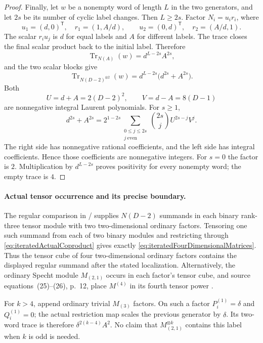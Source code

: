 \begin{proof}
Finally, let \(w\) be a nonempty word of length \(L\) in
the two generators, and let \(2s\) be its number of cyclic
label changes. Then \(L\ge2s\). Factor
\(N_i=u_i r_i\), where
\[
 u_1=(d,0)^{\mathsf T},\quad r_1=(1,A/d),\qquad
 u_2=(0,d)^{\mathsf T},\quad r_2=(A/d,1).
\]
The scalar \(r_i u_j\) is \(d\) for equal labels and
\(A\) for different labels. The trace closes the final
scalar product back to the initial label. Therefore
\[
 \operatorname{Tr}_{N(A)}(w)=d^{L-2s}A^{2s},
\]
and the two scalar blocks give
\begin{equation}\label{eq:iteratedAllWordTrace}
 \operatorname{Tr}_{N(D-2)^{\otimes2}}(w)
          =d^{L-2s}\bigl(d^{2s}+A^{2s}\bigr).
\end{equation}
Both
\[
 U=d+A=2(D-2)^2,\qquad V=d-A=8(D-1)
\]
are nonnegative integral Laurent polynomials. For \(s\ge1\),
\[
 d^{2s}+A^{2s}
   =2^{1-2s}
      \sum_{\substack{0\le j\le2s\\ j\ \mathrm{even}}}
        \binom{2s}{j}U^{2s-j}V^j.
\]
The right side has nonnegative rational coefficients,
and the left side has integral coefficients. Hence those
coefficients are nonnegative integers. For \(s=0\) the
factor is \(2\). Multiplication by \(d^{L-2s}\) proves
positivity for every nonempty word; the empty trace is \(4\).
\end{proof}

\paragraph{Actual tensor occurrence and its precise boundary.}
The regular comparison in / supplies
\(N(D-2)\) summands in each binary rank-three tensor module
with two two-dimensional ordinary factors.
Tensoring one such summand from each of two binary
modules and restricting through
\eqref{eq:iteratedActualCoproduct} gives exactly
\eqref{eq:iteratedFourDimensionalMatrices}.
Thus the tensor cube of four two-dimensional ordinary
factors contains the displayed regular summand after
the stated localization.
Alternatively, the ordinary Specht module \(M_{(2,1)}\)
occurs in each factor's tensor cube, and source
equations~(25)--(26), p.~12, place \(M^{(4)}\) in its
fourth tensor power \cite{BlasiakChebyshev}.

For \(k>4\), append ordinary trivial \(M_{(3)}\) factors.
On such a factor \(P_i^{(1)}=\delta\) and \(Q_i^{(1)}=0\);
the actual restriction map scales the previous generator
by \(\delta\). Its two-word trace is therefore
\(\delta^{2(k-4)}A^2\).
No claim that \(M_{(2,1)}^{\otimes k}\) contains this
label when \(k\) is odd is needed.

